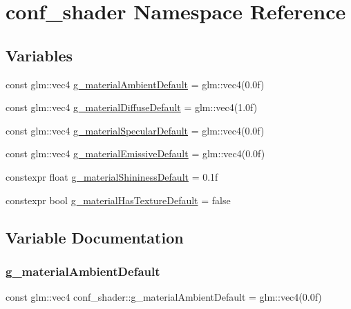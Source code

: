 \hypertarget{namespaceconf__shader}{}\section{conf\+\_\+shader Namespace Reference}
\label{namespaceconf__shader}
\subsection*{Variables}
\begin{DoxyCompactItemize}
\item 
const glm\+::vec4 \mbox{\hyperlink{namespaceconf__shader_ac6c3c15069ea3f7eb5bb887be2271158}{g\+\_\+material\+Ambient\+Default}} = glm\+::vec4(0.\+0f)
\item 
const glm\+::vec4 \mbox{\hyperlink{namespaceconf__shader_a856df0bab1c443a1b4aea72a95324c79}{g\+\_\+material\+Diffuse\+Default}} = glm\+::vec4(1.\+0f)
\item 
const glm\+::vec4 \mbox{\hyperlink{namespaceconf__shader_abce3f1ff56dd74a9e131c515c25e934d}{g\+\_\+material\+Specular\+Default}} = glm\+::vec4(0.\+0f)
\item 
const glm\+::vec4 \mbox{\hyperlink{namespaceconf__shader_a3f79a773138cd441b6c3a93a1494a62f}{g\+\_\+material\+Emissive\+Default}} = glm\+::vec4(0.\+0f)
\item 
constexpr float \mbox{\hyperlink{namespaceconf__shader_a024e4aa6cd74ae96015a9c38e9291a97}{g\+\_\+material\+Shininess\+Default}} = 0.\+1f
\item 
constexpr bool \mbox{\hyperlink{namespaceconf__shader_a60560f8a8fc34f0d3f1a1f3bdbd89b5e}{g\+\_\+material\+Has\+Texture\+Default}} = false
\end{DoxyCompactItemize}


\subsection{Variable Documentation}
\mbox{\label{namespaceconf__shader_ac6c3c15069ea3f7eb5bb887be2271158}} 
\subsubsection{\texorpdfstring{g\+\_\+material\+Ambient\+Default}{g\_materialAmbientDefault}}
{\footnotesize\ttfamily const glm\+::vec4 conf\+\_\+shader\+::g\+\_\+material\+Ambient\+Default = glm\+::vec4(0.\+0f)}

